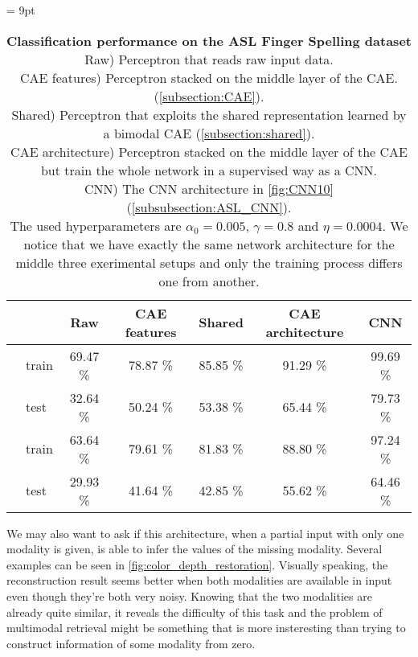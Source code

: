\begin{table}[H]
  \tabcolsep = 9pt
  \caption{\textbf{Classification performance on the ASL Finger Spelling
    dataset}\\[0.1em]
    Raw) Perceptron that reads raw input data.\\[0.1em]
    CAE features) Perceptron stacked on the middle layer of the CAE.
      (\ref{subsection:CAE}).\\[0.1em]
    Shared) Perceptron that exploits the shared representation learned
      by a bimodal CAE (\ref{subsection:shared}).\\[0.1em]
    CAE architecture) Perceptron stacked on the middle layer of the CAE
      but train the whole network in a supervised way as a CNN.\\[0.1em]
    CNN) The CNN architecture in \autoref{fig:CNN10}
      (\ref{subsubsection:ASL_CNN}). \\[0.1em]
    The used hyperparameters are $\alpha_0=0.005$, $\gamma=0.8$ and
    $\eta=0.0004$. We notice that we have exactly the same network
    architecture for the middle three exerimental setups and only the
    training process differs one from another.
    }
  \label{tab:ASL_classif}
  \begin{tabular*}{\linewidth}{>{\bf}llccccc}
    \toprule
    && Raw & CAE features & Shared & CAE architecture & CNN\\
    \midrule
    \multirow{2}{*}{Intensity} &
    train & 69.47 \% & 78.87 \% & 85.85 \% & 91.29 \% & 99.69 \% \\
    & test & 32.64 \% & 50.24 \% & 53.38 \% & 65.44 \% & 79.73 \% \\
    \midrule
    \multirow{2}{*}{Depth} &
    train & 63.64 \% & 79.61 \% & 81.83 \% & 88.80 \% & 97.24 \% \\
    & test & 29.93 \% & 41.64 \% & 42.85 \% & 55.62 \% & 64.46 \% \\
    \bottomrule
  \end{tabular*}
\end{table}

We may also want to ask if this architecture, when a partial input with
only one modality is given, is able to infer the values of the missing
modality.
Several examples can be seen in \autoref{fig:color_depth_restoration}.
Visually speaking, the reconstruction result seems better when
both modalities are available in input even though they're both very noisy.
Knowing that the two modalities are already quite similar, it reveals
the difficulty of this task and the problem of multimodal retrieval
might be something that is more insteresting than trying to construct
information of some modality from zero.

